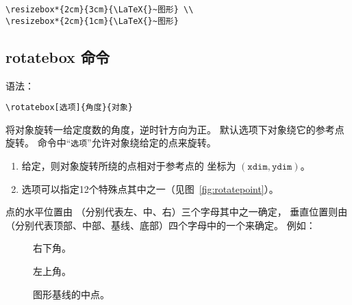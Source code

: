 \begin{center}
\begin{minipage}[b]{.4\textwidth}
	\begin{center}
		\par\vspace{0pt}
	\end{center}
\end{minipage}%
\begin{minipage}[b]{.6\textwidth}
\begin{lstlisting}
\resizebox*{2cm}{3cm}{\LaTeX{}~图形} \\
\resizebox*{2cm}{1cm}{\LaTeX{}~图形}
\end{lstlisting}
\par\vspace{0pt}
\end{minipage}
\end{center}


\subsection{rotatebox 命令}\label{ssec:rotatebox}
语法：
\begin{lstlisting}
\rotatebox[选项]{角度}{对象}
\end{lstlisting}
 将对象旋转一给定度数的角度，逆时针方向为正。
默认选项下对象绕它的参考点旋转。
 命令中“\texttt{选项}”允许对象绕给定的点来旋转。
\begin{enumerate}
	\item 给定\opt{[x=xdim,y=ydim]}，则对象旋转所绕的点相对于参考点的
	坐标为 $(\mathtt{xdim}, \mathtt{ydim})$。
	\item {} 选项可以指定12个特殊点其中之一（见图~\ref{fig:rotatepoint}）。
\end{enumerate}

 点的水平位置由 （分别代表左、中、右）三个字母其中之一确定，
垂直位置则由 （分别代表顶部、中部、基线、底部）四个字母中的一个来确定。
例如：
\begin{description}
	\item [\opt{[rb]}] 右下角。
	\item [\opt{[lt]}] 左上角。
	\item [\opt{[cB]}] 图形基线的中点。
\end{description}

